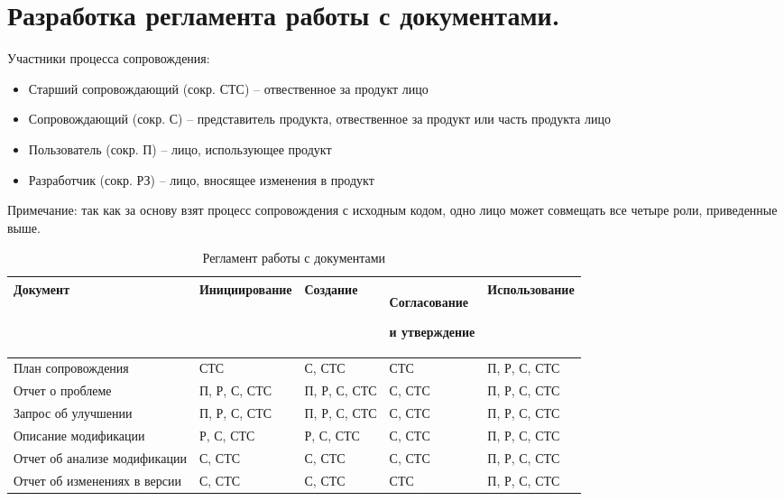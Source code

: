 
\pagebreak


\section{Разработка регламента работы с документами.}

Участники процесса сопровождения:
\begin{itemize}
    \item Старший сопровождающий (сокр. СТС) -- отвественное за продукт лицо
    \item Сопровождающий (сокр. С) -- представитель продукта, отвественное за продукт или часть продукта лицо
    \item Пользователь (сокр. П) -- лицо, использующее продукт
    \item Разработчик (сокр. РЗ) -- лицо, вносящее изменения в продукт
\end{itemize}

Примечание: так как за основу взят процесс сопровождения с исходным кодом, одно лицо может совмещать все четыре роли, приведенные выше.

\begin{center}
    \begin{longtable}{|p{3cm}|p{3.3cm}|p{3cm}|p{3cm}|p{3cm}|}
        \caption{Регламент работы с документами} \\
        \hline
        Документ                     & Инициирование & Создание     & Согласование \par и утверждение & Использование \\
        \hline
        План сопровождения           & СТС           & С, СТС       & СТС                             & П, Р, С, СТС  \\
        \hline
        Отчет о проблеме             & П, Р, С, СТС  & П, Р, С, СТС & С, СТС                          & П, Р, С, СТС  \\
        \hline
        Запрос об улучшении          & П, Р, С, СТС  & П, Р, С, СТС & С, СТС                          & П, Р, С, СТС  \\
        \hline
        Описание модификации         & Р, С, СТС     & Р, С, СТС    & С, СТС                          & П, Р, С, СТС  \\
        \hline
        Отчет об анализе модификации & С, СТС        & С, СТС       & С, СТС                          & П, Р, С, СТС  \\
        \hline
        Отчет об изменениях в версии & С, СТС        & С, СТС       & СТС                             & П, Р, С, СТС  \\
        \hline
    \end{longtable}
\end{center}

